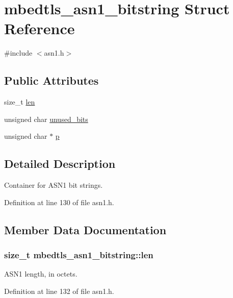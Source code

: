 \hypertarget{structmbedtls__asn1__bitstring}{\section{mbedtls\-\_\-asn1\-\_\-bitstring Struct Reference}
\label{structmbedtls__asn1__bitstring}
}


{\ttfamily \#include $<$asn1.\-h$>$}

\subsection*{Public Attributes}
\begin{DoxyCompactItemize}
\item 
size\-\_\-t \hyperlink{structmbedtls__asn1__bitstring_a943b4155650f680f3906ca9be0e66f80}{len}
\item 
unsigned char \hyperlink{structmbedtls__asn1__bitstring_aca26541c9ecb384ef2d5c2ca6a05a25b}{unused\-\_\-bits}
\item 
unsigned char $\ast$ \hyperlink{structmbedtls__asn1__bitstring_af09328f8b1a8cb5bf4afae369ce3629c}{p}
\end{DoxyCompactItemize}


\subsection{Detailed Description}
Container for A\-S\-N1 bit strings. 

Definition at line 130 of file asn1.\-h.



\subsection{Member Data Documentation}
\hypertarget{structmbedtls__asn1__bitstring_a943b4155650f680f3906ca9be0e66f80}{
\subsubsection[{len}]{\setlength{\rightskip}{0pt plus 5cm}size\-\_\-t mbedtls\-\_\-asn1\-\_\-bitstring\-::len}}\label{structmbedtls__asn1__bitstring_a943b4155650f680f3906ca9be0e66f80}
A\-S\-N1 length, in octets. 

Definition at line 132 of file asn1.\-h.

